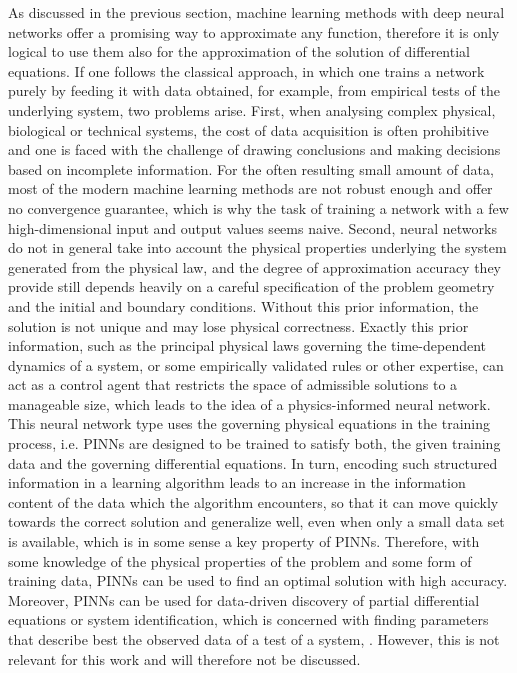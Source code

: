 As discussed in the previous section, machine learning methods with deep neural networks offer a promising way to approximate any function, therefore it is only logical to use them also for the approximation of the solution of differential equations. If one follows the classical approach, in which one trains a network purely by feeding it with data obtained, for example, from empirical tests of the underlying system, two problems arise. First, when analysing complex physical, biological or technical systems, the cost of data acquisition is often prohibitive and one is faced with the challenge of drawing conclusions and making decisions based on incomplete information. For the often resulting small amount of data, most of the modern machine learning methods are not robust enough and offer no convergence guarantee, which is why the task of training a network with a few high-dimensional input and output values seems naive. Second, neural networks do not in general take into account the physical properties underlying the system generated from the physical law, and the degree of approximation accuracy they provide still depends heavily on a careful specification of the problem geometry and the initial and boundary conditions. Without this prior information, the solution is not unique and may lose physical correctness. Exactly this prior information, such as the principal physical laws governing the time-dependent dynamics of a system, or some empirically validated rules or other expertise, can act as a control agent that restricts the space of admissible solutions to a manageable size, which leads to the idea of a physics-informed neural network. This neural network type uses the governing physical equations in the training process, i.e. PINNs are designed to be trained to satisfy both, the given training data and the governing differential equations. In turn, encoding such structured information in a learning algorithm leads to an increase in the information content of the data which the algorithm encounters, so that it can move quickly towards the correct solution and generalize well, even when only a small data set is available, which is in some sense a key property of PINNs. Therefore, with some knowledge of the physical properties of the problem and some form of training data, PINNs can be used to find an optimal solution with high accuracy. Moreover, PINNs can be used for data-driven discovery of partial differential equations or system identification, which is concerned with finding parameters that describe best the observed data of a test of a system, \cite[pp.~1-2]{RaissiPerdikarisKarniadakisPart1:2017}. However, this is not relevant for this work and will therefore not be discussed. \\
